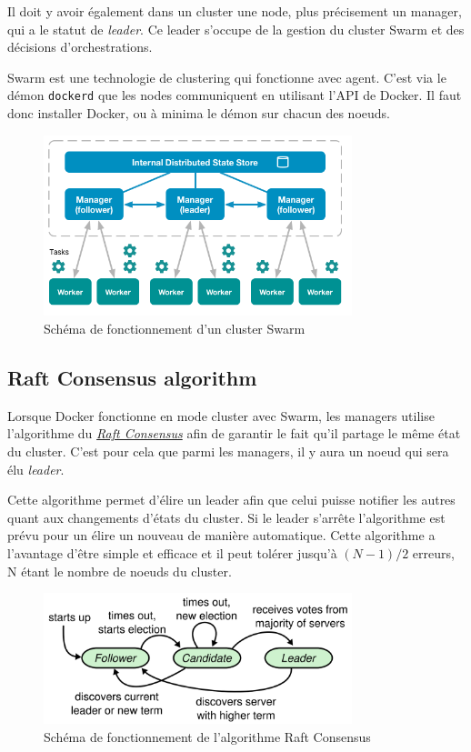 Il doit y avoir également dans un cluster une node, plus précisement un manager, qui a le statut de
\emph{leader}. Ce leader s'occupe de la gestion du cluster Swarm et des décisions d'orchestrations.

Swarm est une technologie de clustering qui fonctionne avec agent. C'est via le démon
\verb:dockerd: que les nodes communiquent en utilisant l'API de Docker. Il faut donc installer
Docker, ou à minima le démon sur chacun des noeuds.

\begin{figure}[h!]
    \centering
    \includegraphics[width=0.8\textwidth]{img/swarm-network}
    \caption{Schéma de fonctionnement d'un cluster Swarm}
\end{figure}

\subsection{Raft Consensus algorithm}

Lorsque Docker fonctionne en mode cluster avec Swarm, les managers utilise l'algorithme du
\href{https://raft.github.io/}{\emph{Raft Consensus}} afin de garantir le fait qu'il partage le
même état du cluster. C'est pour cela que parmi les managers, il y aura un noeud qui sera élu
\emph{leader}.\newline

Cette algorithme permet d'élire un leader afin que celui puisse notifier les autres quant aux
changements d'états du cluster. Si le leader s'arrête l'algorithme est prévu pour un élire un
nouveau de manière automatique. Cette algorithme a l'avantage d'être simple et efficace et il
peut tolérer jusqu'à $(N - 1) / 2$ erreurs, N étant le nombre de noeuds du cluster.

\begin{figure}[h!]
    \centering
    \includegraphics[width=0.8\textwidth]{img/raft}
    \caption{Schéma de fonctionnement de l'algorithme Raft Consensus}
\end{figure}

